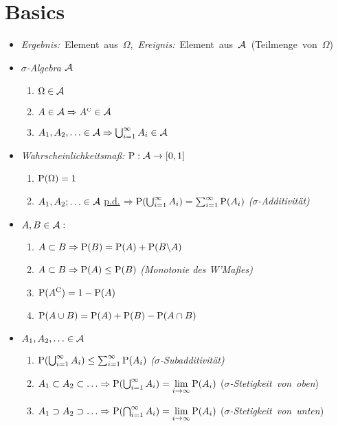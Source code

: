 \section{Basics}

\begin{itemize}
\item \mbox{\textit{Ergebnis:} Element aus $\Omega$, 
\textit{Ereignis: } Element aus $\A$ (Teilmenge von $\Omega$)}

\item \textit{$\sigma$-Algebra $\A$}
	\begin{enumerate}
	\item $\Omega\in\A$
	\item $A\in\A \Rightarrow \compl{A}\in\A$
	\item $A_1, A_2,\ldots\in\A \Rightarrow \bigcup_{i=1}^{\infty} A_i \in\A$
	\end{enumerate}
	
\item \textit{Wahrscheinlichkeitsmaß:} $\P:\A\rightarrow [0,1]$
	\begin{enumerate}
	\item $\P(\Omega)=1$
	\item $A_1,A_2;\ldots\in\A$ \underline{p.d.} 
	$\Rightarrow \P(\bigcup_{i=1}^{\infty} A_i)
	= \sum_{i=1}^{\infty}\P(A_i)$ \hfill\textit{($\sigma$-Additivität)}
	\end{enumerate}

\item $A,B\in\A:$
	\begin{enumerate}
	\item $A\subset B \Rightarrow \P(B)=\P(A)+\P(B\backslash A)$
	\item $A\subset B \Rightarrow \P(A)\leq\P(B)$
	\hfill\textit{(Monotonie des W'Maßes)}
	\item $\P(A^{\text{C}})=1-\P(A)$
	\item $\P(A\cup B) = \P(A)+\P(B)-\P(A\cap B)$
	\end{enumerate}
	
\item $A_1,A_2,\ldots\in\A$
	\begin{enumerate}
	\item $\P(\bigcup_{i=1}^{\infty} A_i)\leq\sum_{i=1}^{\infty} \P(A_i)$ 
	\hfill\textit{($\sigma$-Subadditivität)}
	\item $A_1\subset A_2\subset\ldots \Rightarrow 
	\P(\bigcup_{i=1}^{\infty} A_i)=\lim\limits_{i\to\infty} \P(A_i)$
	\hfill\mbox{(\textit{$\sigma$-Stetigkeit von oben})}
	\item $A_1 \supset A_2\supset\ldots \Rightarrow
	\P(\bigcap_{i=1}^{\infty} A_i)=\lim\limits_{i\to\infty} \P(A_i)$
	\hfill\mbox{(\textit{$\sigma$-Stetigkeit von unten})}
	\end{enumerate}


\end{itemize}
